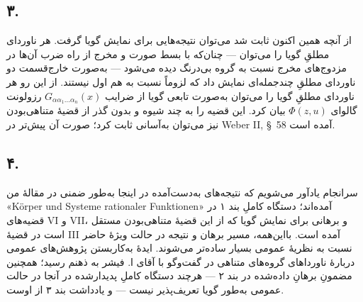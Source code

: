 \documentclass[11pt]{article}
\begin{document}
\subsection*{۳.}
از آنچه همین اکنون ثابت شد می‌توان نتیجه‌هایی برای نمایش گویا گرفت. هر ناوردای مطلقِ گویا را می‌توان --- چنان‌که با بسط صورت و مخرج از راه ضرب آن‌ها در مزدوج‌های مخرج نسبت به گروه بی‌درنگ دیده می‌شود --- به‌صورت خارج‌قسمت دو ناوردای مطلقِ چندجمله‌ای نمایش داد که لزوماً نسبت به هم اول نیستند. از این رو هر ناوردای مطلقِ گویا را می‌توان به‌صورت تابعی گویا از ضرایب $G_{\alpha\alpha_1\ldots\alpha_n}(x)$ رزولونت گالوای $\Phi(z,u)$ بیان کرد. این قضیه را به چند شیوه و بدون گذر از قضیهٔ متناهی‌بودن نیز می‌توان به‌آسانی ثابت کرد؛ صورت آن پیش‌تر در Weber II, \S\ 58 آمده است.

\subsection*{۴.}
سرانجام یادآور می‌شویم که نتیجه‌های به‌دست‌آمده در اینجا به‌طور ضمنی در مقالهٔ من «Körper und Systeme rationaler Funktionen» آمده‌اند؛ دستگاه کاملِ بند ۱ در قضیه‌های VI و VII، و برهانی برای نمایش گویا که از این قضیهٔ متناهی‌بودن مستقل است در قضیهٔ III آمده است. بااین‌همه، مسیر برهان و نتیجه در حالت ویژهٔ حاضر نسبت به نظریهٔ عمومی بسیار ساده‌تر می‌شوند. ایدهٔ به‌کاربستن پژوهش‌های عمومی دربارهٔ ناورداهای گروه‌های متناهی در گفت‌وگو با آقای ا. فیشر به ذهنم رسید؛ همچنین مضمونِ برهانِ داده‌شده در بند ۲ --- هرچند دستگاه کاملِ پدیدارشده در آنجا در حالت عمومی به‌طور گویا تعریف‌پذیر نیست --- و یادداشت بند ۳ از اوست.
\end{document}
